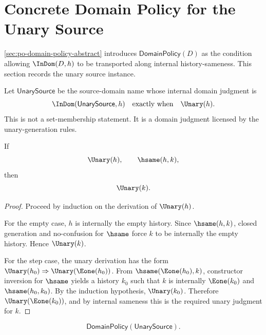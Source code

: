 \section{Concrete Domain Policy for the Unary Source}
\label{sec:po-domain-policy-unary}

\autoref{sec:po-domain-policy-abstract} introduces \(\mathsf{DomainPolicy}(D)\) as the condition allowing \(\InDom(D,h)\) to be transported along internal history-sameness. This section records the unary source instance.

\begin{definition}
\label{def:unary-source-domain}
Let \(\mathsf{UnarySource}\) be the source-domain name whose internal domain judgment is
$$
  \InDom(\mathsf{UnarySource},h)
  \quad\text{exactly when}\quad
  \Unary(h).
$$
This is not a set-membership statement. It is a domain judgment licensed by the unary-generation rules.
\end{definition}

\begin{lemma}
\label{lem:unary-transport}
If
$$
  \Unary(h),\qquad \hsame(h,k),
$$
then
$$
  \Unary(k).
$$
\end{lemma}

\begin{proof}
Proceed by induction on the derivation of \(\Unary(h)\).

For the empty case, \(h\) is internally the empty history. Since \(\hsame(h,k)\), closed generation and no-confusion for \(\hsame\) force \(k\) to be internally the empty history. Hence \(\Unary(k)\).

For the step case, the unary derivation has the form \(\Unary(h_0)\Rightarrow\Unary(\Eone(h_0))\). From \(\hsame(\Eone(h_0),k)\), constructor inversion for \(\hsame\) yields a history \(k_0\) such that \(k\) is internally \(\Eone(k_0)\) and \(\hsame(h_0,k_0)\). By the induction hypothesis, \(\Unary(k_0)\). Therefore \(\Unary(\Eone(k_0))\), and by internal sameness this is the required unary judgment for \(k\).
\end{proof}

\begin{theorem}
\label{thm:unary-domain-policy}
$$
  \mathsf{DomainPolicy}(\mathsf{UnarySource}).
$$
\end{theorem}


